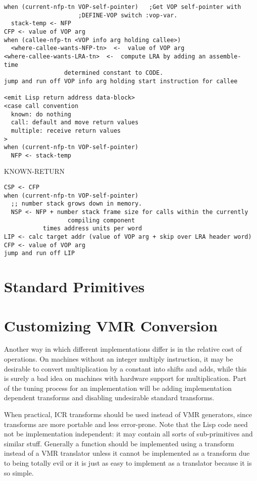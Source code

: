 \begin{verbatim}
when (current-nfp-tn VOP-self-pointer)   ;Get VOP self-pointer with
					 ;DEFINE-VOP switch :vop-var.
  stack-temp <- NFP
CFP <- value of VOP arg
when (callee-nfp-tn <VOP info arg holding callee>)
  <where-callee-wants-NFP-tn>  <-  value of VOP arg
<where-callee-wants-LRA-tn>  <-  compute LRA by adding an assemble-time
				 determined constant to CODE.
jump and run off VOP info arg holding start instruction for callee

<emit Lisp return address data-block>
<case call convention
  known: do nothing
  call: default and move return values
  multiple: receive return values
>
when (current-nfp-tn VOP-self-pointer)   
  NFP <- stack-temp
\end{verbatim}

KNOWN-RETURN
\begin{verbatim}
CSP <- CFP
when (current-nfp-tn VOP-self-pointer)
  ;; number stack grows down in memory.
  NSP <- NFP + number stack frame size for calls within the currently
                  compiling component
	       times address units per word
LIP <- calc target addr (value of VOP arg + skip over LRA header word)
CFP <- value of VOP arg
jump and run off LIP

\end{verbatim}


\chapter{Standard Primitives}


\chapter{Customizing VMR Conversion}

Another way in which different implementations differ is in the relative cost
of operations.  On machines without an integer multiply instruction, it may be
desirable to convert multiplication by a constant into shifts and adds, while
this is surely a bad idea on machines with hardware support for multiplication.
Part of the tuning process for an implementation will be adding implementation
dependent transforms and disabling undesirable standard transforms.

When practical, ICR transforms should be used instead of VMR generators, since
transforms are more portable and less error-prone.  Note that the Lisp code
need not be implementation independent: it may contain all sorts of
sub-primitives and similar stuff.  Generally a function should be implemented
using a transform instead of a VMR translator unless it cannot be implemented
as a transform due to being totally evil or it is just as easy to implement as
a translator because it is so simple.


